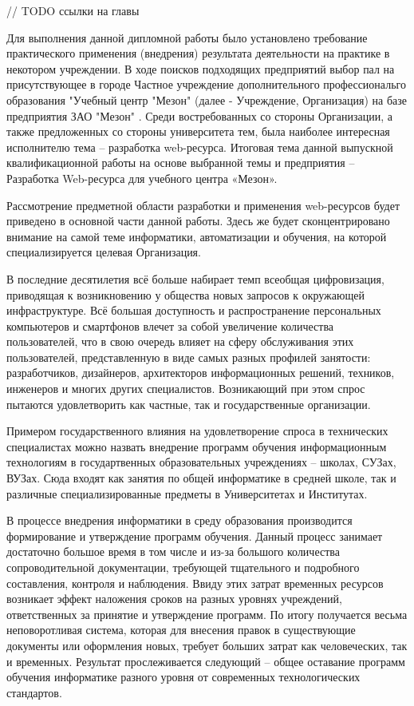 
// TODO ссылки на главы

Для выполнения данной дипломной работы было установлено требование практического применения (внедрения) результата деятельности на практике в некотором учреждении. В ходе поисков подходящих предприятий выбор пал на присутствующее в городе Частное учреждение дополнительного профессиональго образования "Учебный центр "Мезон" \cite{meson-uc} (далее - Учреждение, Организация) на базе предприятия ЗАО "Мезон" \cite{meson}. Среди востребованных со стороны Организации, а также предложенных со стороны университета тем, была наиболее интересная исполнителю тема -- разработка web-ресурса. Итоговая тема данной выпускной квалификационной работы на основе выбранной темы и предприятия -- Разработка Web-ресурса для учебного центра «Мезон».

Рассмотрение предметной области разработки и применения web-ресурсов будет приведено в основной части данной работы. Здесь же будет сконцентрировано внимание на самой теме информатики, автоматизации и обучения, на которой специализируется целевая Организация.

В последние десятилетия всё больше набирает темп всеобщая цифровизация, приводящая к возникновению у общества новых запросов к окружающей инфраструктуре.
Всё большая доступность и распространение персональных компьютеров и смартфонов влечет за собой увеличение количества пользователей, что в свою очередь влияет на сферу обслуживания этих пользователей, представленную в виде самых разных профилей занятости: разработчиков, дизайнеров, архитекторов информационных решений, техников, инженеров и многих других специалистов.
Возникающий при этом спрос пытаются удовлетворить как частные, так и государственные организации.

Примером государственного влияния на удовлетворение спроса в технических специалистах можно назвать внедрение программ обучения информационным технологиям в государтвенных образовательных учреждениях -- школах, СУЗах, ВУЗах.
Сюда входят как занятия по общей информатике в средней школе, так и различные специализированные предметы в Университетах и Институтах.

В процессе внедрения информатики в среду образования производится формирование и утверждение программ обучения.
Данный процесс занимает достаточно большое время в том числе и из-за большого количества сопроводительной документации, требующей тщательного и подробного составления, контроля и наблюдения.
Ввиду этих затрат временных ресурсов возникает эффект наложения сроков на разных уровнях учреждений, ответственных за принятие и утверждение программ.
По итогу получается весьма неповоротливая система, которая для внесения правок в существующие документы или оформления новых, требует больших затрат как человеческих, так и временных.
Результат прослеживается следующий -- общее оставание программ обучения информатике разного уровня от современных технологических стандартов.

